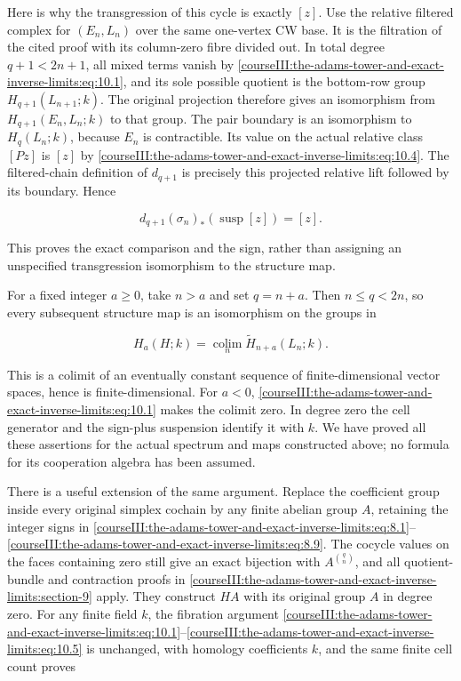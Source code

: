 Here is why the transgression of this cycle is exactly \([z]\). Use the relative filtered complex for \((E_n,L_n)\) over the same one-vertex CW base. It is the filtration of the cited proof with its column-zero fibre divided out. In total degree \(q+1<2n+1\), all mixed terms vanish by \eqref{courseIII:the-adams-tower-and-exact-inverse-limits:eq:10.1}, and its sole possible quotient is the bottom-row group \(H_{q+1}(L_{n+1};k)\). The original projection therefore gives an isomorphism from \(H_{q+1}(E_n,L_n;k)\) to that group. The pair boundary is an isomorphism to \(H_q(L_n;k)\), because \(E_n\) is contractible. Its value on the actual relative class \([Pz]\) is \([z]\) by \eqref{courseIII:the-adams-tower-and-exact-inverse-limits:eq:10.4}. The filtered-chain definition of \(d_{q+1}\) is precisely this projected relative lift followed by its boundary. Hence

\begin{equation}
d_{q+1}(\sigma_n)_*(\operatorname{susp}[z])=[z].
 \label{courseIII:the-adams-tower-and-exact-inverse-limits:eq:10.5}
\end{equation}

This proves the exact comparison and the sign, rather than assigning an unspecified transgression isomorphism to the structure map.

For a fixed integer \(a\geq0\), take \(n>a\) and set \(q=n+a\). Then \(n\leq q<2n\), so every subsequent structure map is an isomorphism on the groups in

\begin{equation}
H_a(H;k)=\underset{n}{\operatorname{colim}}
          \widetilde H_{n+a}(L_n;k).
 \label{courseIII:the-adams-tower-and-exact-inverse-limits:eq:10.6}
\end{equation}

This is a colimit of an eventually constant sequence of finite-dimensional vector spaces, hence is finite-dimensional. For \(a<0\), \eqref{courseIII:the-adams-tower-and-exact-inverse-limits:eq:10.1} makes the colimit zero. In degree zero the cell generator and the sign-plus suspension identify it with \(k\). We have proved all these assertions for the actual spectrum and maps constructed above; no formula for its cooperation algebra has been assumed.

There is a useful extension of the same argument. Replace the coefficient group inside every original simplex cochain by any finite abelian group \(A\), retaining the integer signs in \eqref{courseIII:the-adams-tower-and-exact-inverse-limits:eq:8.1}--\eqref{courseIII:the-adams-tower-and-exact-inverse-limits:eq:8.9}. The cocycle values on the faces containing zero still give an exact bijection with \(A^{\binom qn}\), and all quotient-bundle and contraction proofs in \cref{courseIII:the-adams-tower-and-exact-inverse-limits:section-9} apply. They construct \(HA\) with its original group \(A\) in degree zero. For any finite field \(k\), the fibration argument \eqref{courseIII:the-adams-tower-and-exact-inverse-limits:eq:10.1}--\eqref{courseIII:the-adams-tower-and-exact-inverse-limits:eq:10.5} is unchanged, with homology coefficients \(k\), and the same finite cell count proves


